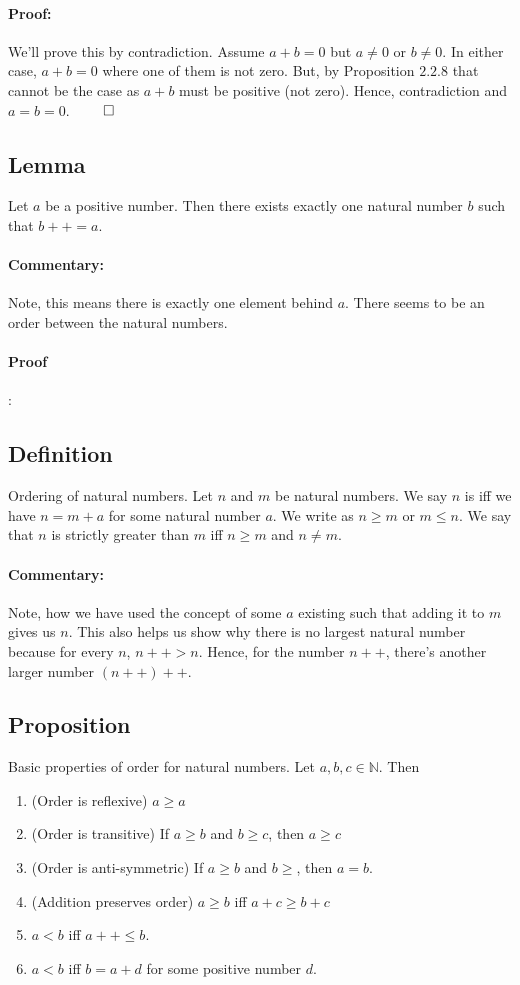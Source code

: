 \documentclass{report}
\begin{document}
\paragraph{Proof: } We'll prove this by contradiction. Assume $a+b = 0 $ but $a \neq 0$ or $b \neq 0$. In either case, $a+b=0$ where one of them is not zero. But, by Proposition $2.2.8$ that cannot be the case as $a+b$ must be positive (not zero). Hence, contradiction and $a = b= 0$.  $\qed$


\subsection{Lemma} Let  $a$ be a positive number. Then there exists exactly one natural number $b$ such that $b++ = a$.
\paragraph{Commentary: } Note, this means there is exactly one element behind $a$. There seems to be an order between the natural numbers.
\paragraph{Proof}: 

\subsection{Definition} Ordering of natural numbers. Let $n$ and $m$ be natural numbers. We say $n$ is  iff we have  $n = m + a$ for some natural number $a$. We write  as $n\geq m $ or  $m \leq n$. We say that $n$ is strictly greater than $m$ iff $n \geq m$ and $n \neq m$. 

\paragraph{Commentary: }Note, how we have used the concept of some $a$ existing such that adding it to $m$ gives us $n$. This also helps us show why there is no largest natural number because for every $n$, $n++ > n$. Hence, for the number $n ++$, there's another larger number $\left( n++ \right) ++$. 


\subsection{Proposition} Basic properties of order for natural numbers. Let $a,b,c \in \mathbb{N}$. Then
\begin{enumerate}
	\item (Order is reflexive) $a \geq a$
	\item (Order is transitive) If  $a \geq b$ and $b \geq c$, then $a \geq c$
	\item (Order is anti-symmetric) If  $a \geq b$ and $b \geq$, then $a =b$.
	\item (Addition preserves order)  $a \geq b$ iff $a+c \geq b+c$
	\item  $a < b$ iff $a++ \leq b$.
	\item  $a < b $ iff $b = a + d$ for some positive number $d$. 
\end{enumerate}
\end{document}
